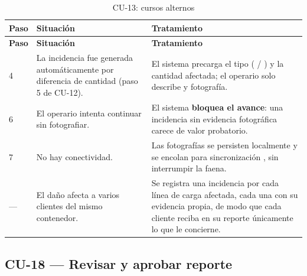 {\estilotabla
\begin{longtable}{C{0.06\textwidth} L{0.38\textwidth} L{0.48\textwidth}}

\caption{CU-13: cursos alternos}
\label{tab:cu13_alt}
\\

\toprule
\textbf{Paso} & \textbf{Situación} & \textbf{Tratamiento} \\
\midrule
\endfirsthead

\toprule
\textbf{Paso} & \textbf{Situación} & \textbf{Tratamiento} \\
\midrule
\endhead

4 & La incidencia fue generada automáticamente por diferencia de cantidad (paso 5 de CU-12). &
El sistema precarga el tipo ( / ) y la cantidad afectada; el
operario solo describe y fotografía. \\
\midrule

6 & El operario intenta continuar sin fotografiar. &
El sistema \textbf{bloquea el avance}: una incidencia sin evidencia fotográfica carece de valor
probatorio. \\
\midrule

7 & No hay conectividad. &
Las fotografías se persisten localmente y se encolan para sincronización , sin
interrumpir la faena. \\
\midrule

--- & El daño afecta a varios clientes del mismo contenedor. &
Se registra una incidencia por cada línea de carga afectada, cada una con su evidencia propia, de
modo que cada cliente reciba en su reporte únicamente lo que le concierne. \\

\bottomrule

\end{longtable}
}

\subsection{CU-18 --- Revisar y aprobar reporte}
\label{subsec:cu18}

